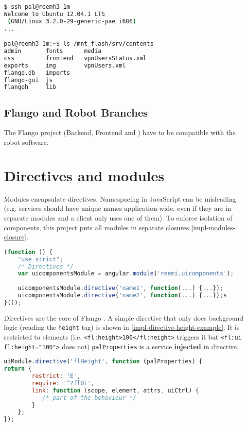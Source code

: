 \begin{lstlisting}[columns=fixed,language=bash,caption=Connection with robots, label=impl-ssh]
$ ssh pal@reemh3-1m
Welcome to Ubuntu 12.04.1 LTS 
 (GNU/Linux 3.2.0-29-generic-pae i686)
...

pal@reemh3-1m:~$ ls /mnt_flash/srv/contents
admin       fonts      media
css         frontend   vpnUsersStatus.xml     
exports     img        vpnUsers.xml
flango.db   imports    
flango-gui  js         
flangoh     lib
\end{lstlisting}

\subsection{Flango and Robot Branches}
The Flango project (Backend, Frontend and \cm) have to be compatible with the robot software.

\section{Directives and modules}
Modules encapsulate directives.
Namespacing in JavaScript can be misleading (e.g. services should have unique names application-wide, even if they are in separate modules and a client only uses one of them).
To enforce isolation of components, this project puts all modules in separate closures \ref{impl-modules-closure}.

\begin{lstlisting}[language=JavaScript, caption=Closures to isolate modules, label=impl-modules-closure]
(function () {
    "use strict";
    /* Directives */
    var uicomponentsModule = angular.module('reemi.uicomponents');
    
    uicomponentsModule.directive('name1', function(...) {...});
    uicomponentsModule.directive('name2', function(...) {...});s
}());
\end{lstlisting}

Directives are the core of Flango \cm .
A simple directive that only does background logic (reading the \texttt{height} tag) is shown in \ref{impl-directive-height-example}.
It is restricted to elements (i.e. \lstinline$<fl:height>100</fl:height>$ triggers it but \lstinline$<fl:ui fl:height="100">$ does not)
\texttt{palProperties} is a service \textbf{injected} in directive.

\begin{lstlisting}[language=JavaScript,caption=flHeight Directive, label=impl-directive-height-example]
uiModule.directive('flHeight', function (palProperties) {
return {
        restrict: 'E',
        require: '^?flUi',
        link: function (scope, element, attrs, uiCtrl) {
           /* part of the behaviour */
        }
    };
});
\end{lstlisting}


